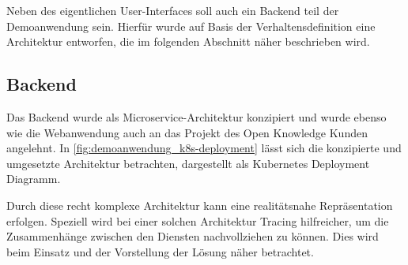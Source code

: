 









Neben des eigentlichen User-Interfaces soll auch ein Backend teil der Demoanwendung sein. Hierfür wurde auf Basis der Verhaltensdefinition eine Architektur entworfen, die im folgenden Abschnitt näher beschrieben wird.

\subsection{Backend}

Das Backend wurde als Microservice-Architektur konzipiert und wurde ebenso wie die Webanwendung auch an das Projekt des Open Knowledge Kunden angelehnt. In \autoref{fig:demoanwendung_k8s-deployment} lässt sich die konzipierte und umgesetzte Architektur betrachten, dargestellt als Kubernetes \cite{KubernetesComponents} Deployment Diagramm.

Durch diese recht komplexe Architektur kann eine realitätsnahe Repräsentation erfolgen. Speziell wird bei einer solchen Architektur Tracing hilfreicher, um die Zusammenhänge zwischen den Diensten nachvollziehen zu können. Dies wird beim Einsatz und der Vorstellung der Lösung näher betrachtet.

